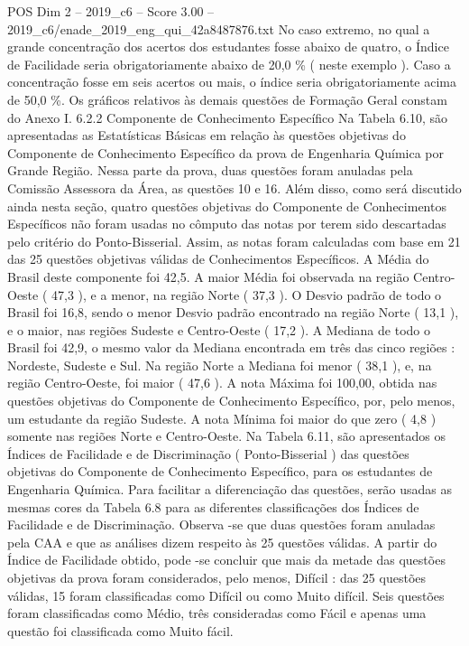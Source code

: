 \begin{textsample}{POS Dim 2 – 2019\_c6 – Score 3.00 – 2019\_c6/enade\_2019\_eng\_qui\_42a8487876.txt}
No caso extremo, no qual a grande concentração dos acertos dos estudantes fosse abaixo de quatro, o Índice de Facilidade seria obrigatoriamente abaixo de 20,0 \% ( neste exemplo ).
Caso a concentração fosse em seis acertos ou mais, o índice seria obrigatoriamente acima de 50,0 \%.
Os gráficos relativos às demais questões de Formação Geral constam do Anexo I. 6.2.2 Componente de Conhecimento Específico Na Tabela 6.10, são apresentadas as Estatísticas Básicas em relação às questões objetivas do Componente de Conhecimento Específico da prova de Engenharia Química por Grande Região.
Nessa parte da prova, duas questões foram anuladas pela Comissão Assessora da Área, as questões 10 e 16.
Além disso, como será discutido ainda nesta seção, quatro questões objetivas do Componente de Conhecimentos Específicos não foram usadas no cômputo das notas por terem sido descartadas pelo critério do Ponto-Bisserial.
Assim, as notas foram calculadas com base em 21 das 25 questões objetivas válidas de Conhecimentos Específicos.
A Média do Brasil deste componente foi 42,5.
A maior Média foi observada na região Centro-Oeste ( 47,3 ), e a menor, na região Norte ( 37,3 ).
O Desvio padrão de todo o Brasil foi 16,8, sendo o menor Desvio padrão encontrado na região Norte ( 13,1 ), e o maior, nas regiões Sudeste e Centro-Oeste ( 17,2 ).
A Mediana de todo o Brasil foi 42,9, o mesmo valor da Mediana encontrada em três das cinco regiões : Nordeste, Sudeste e Sul.
Na região Norte a Mediana foi menor ( 38,1 ), e, na região Centro-Oeste, foi maior ( 47,6 ).
A nota Máxima foi 100,00, obtida nas questões objetivas do Componente de Conhecimento Específico, por, pelo menos, um estudante da região Sudeste.
A nota Mínima foi maior do que zero ( 4,8 ) somente nas regiões Norte e Centro-Oeste.
Na Tabela 6.11, são apresentados os Índices de Facilidade e de Discriminação ( Ponto-Bisserial ) das questões objetivas do Componente de Conhecimento Específico, para os estudantes de Engenharia Química.
Para facilitar a diferenciação das questões, serão usadas as mesmas cores da Tabela 6.8 para as diferentes classificações dos Índices de Facilidade e de Discriminação.
Observa -se que duas questões foram anuladas pela CAA e que as análises dizem respeito às 25 questões válidas.
A partir do Índice de Facilidade obtido, pode -se concluir que mais da metade das questões objetivas da prova foram considerados, pelo menos, Difícil : das 25 questões válidas, 15 foram classificadas como Difícil ou como Muito difícil.
Seis questões foram classificadas como Médio, três consideradas como Fácil e apenas uma questão foi classificada como Muito fácil.

\end{textsample}
